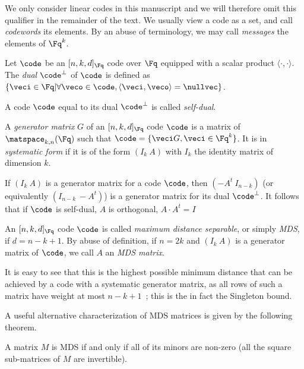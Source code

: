 We only consider linear codes in this manuscript and we will therefore omit this qualifier in the remainder of the text. 
We usually view a code as a set, and call \emph{codewords} its elements. By an abuse of terminology, we may call \emph{messages} the elements of $\Fq^k$.

\begin{defi}
Let $\code$ be an $[n, k, d]_{\Fq}$ code over $\Fq$ equipped with a scalar product $\langle\cdot,\cdot\rangle$. The \emph{dual}
$\code^\bot$ of $\code$ is defined as $\{\veci \in \Fq | \forall \veco \in \code, \langle\veci,\veco\rangle = \nullvec\}$.
\end{defi}

A code $\code$ equal to its dual $\code^\bot$ is called \emph{self-dual}.


\begin{defi}
A \emph{generator matrix} $G$ of an $[n, k, d]_{\Fq}$ code $\code$ is a matrix of $\matspace_{k,n}(\Fq)$ such that
$\code = \{\veci G, \veci \in \Fq^k\}$. It is in \emph{systematic form} if it is of the form $(I_k~A)$ with
$I_k$ the identity matrix of dimension $k$. 
\end{defi}

If $(I_k~A)$ is a generator matrix for a code $\code$, then $(-A^t~I_{n-k})$ (or equivalently $(I_{n-k}~-A^t)$)
is a generator matrix for its dual $\code^\bot$. It follows that if $\code$ is self-dual, $A$ is orthogonal,
\ie $A\cdot A^t = I$

\begin{defi}
An $[n,k,d]_{\Fq}$ code $\code$ is called \emph{maximum distance separable}, or simply \emph{MDS}, if $d = n - k + 1$.
By abuse of definition, if $n = 2k$ and $(I_k~A)$ is a generator matrix of $\code$, we call $A$ an \emph{MDS matrix}.
\end{defi}

It is easy to see that this is the highest possible minimum distance that can be achieved by a code with a
systematic generator matrix, as all rows of such a matrix have weight at most $n - k + 1$~; this is the
in fact the Singleton bound.

A useful alternative characterization of MDS matrices is given by the following theorem.

\begin{thm}
\label{thm:mds_minors}
A matrix $M$ is MDS if and only if all of its minors are non-zero (\ie all the square sub-matrices of $M$ are invertible).
\end{thm}


